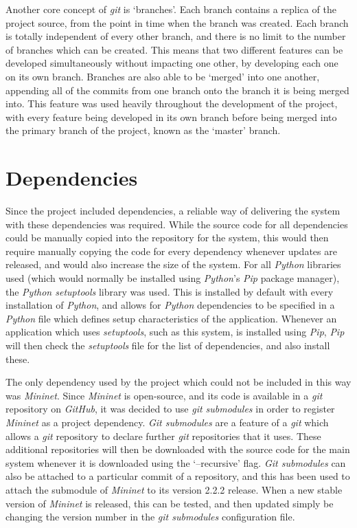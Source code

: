 Another core concept of \textit{git} is `branches'.
Each branch contains a replica of the project source, from the point in time when the branch was created.
Each branch is totally independent of every other branch, and there is no limit to the number of branches which can be created.
This means that two different features can be developed simultaneously without impacting one other, by developing each one on its own branch.
Branches are also able to be `merged' into one another, appending all of the commits from one branch onto the branch it is being merged into.
This feature was used heavily throughout the development of the project, with every feature being developed in its own branch before being merged into the primary branch of the project, known as the `master' branch.

\section{Dependencies}

Since the project included dependencies, a reliable way of delivering the system with these dependencies was required.
While the source code for all dependencies could be manually copied into the repository for the system, this would then require manually copying the code for every dependency whenever updates are released, and would also increase the size of the system.
For all \textit{Python} libraries used (which would normally be installed using \textit{Python}'s \textit{Pip} package manager), the \textit{Python setuptools} \cite{python_setuptools} library was used.
This is installed by default with every installation of \textit{Python}, and allows for \textit{Python} dependencies to be specified in a \textit{Python} file which defines setup characteristics of the application.
Whenever an application which uses \textit{setuptools}, such as this system, is installed using \textit{Pip}, \textit{Pip} will then check the \textit{setuptools} file for the list of dependencies, and also install these.

The only dependency used by the project which could not be included in this way was \textit{Mininet}.
Since \textit{Mininet} is open-source, and its code is available in a \textit{git} repository on \textit{GitHub}, it was decided to use \textit{git submodules} in order to register \textit{Mininet} as a project dependency.
\textit{Git submodules} are a feature of a \textit{git} which allows a \textit{git} repository to declare further \textit{git} repositories that it uses.
These additional repositories will then be downloaded with the source code for the main system whenever it is downloaded using the `--recursive' flag.
\textit{Git submodules} can also be attached to a particular commit of a repository, and this has been used to attach the submodule of \textit{Mininet} to its version 2.2.2 release.
When a new stable version of \textit{Mininet} is released, this can be tested, and then updated simply be changing the version number in the \textit{git submodules} configuration file.
